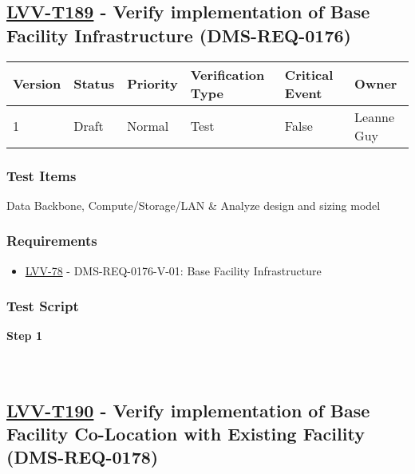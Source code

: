 \hypertarget{lvv-t189---verify-implementation-of-base-facility-infrastructure-dms-req-0176}{%
\subsection{\texorpdfstring{\href{https://jira.lsstcorp.org/secure/Tests.jspa\#/testCase/LVV-T189}{LVV-T189}
- Verify implementation of Base Facility Infrastructure
(DMS-REQ-0176)}{LVV-T189 - Verify implementation of Base Facility Infrastructure (DMS-REQ-0176)}}\label{lvv-t189---verify-implementation-of-base-facility-infrastructure-dms-req-0176}}

\begin{longtable}[]{@{}llllll@{}}
\toprule
Version & Status & Priority & Verification Type & Critical Event &
Owner\tabularnewline
\midrule
\endhead
1 & Draft & Normal & Test & False & Leanne Guy\tabularnewline
\bottomrule
\end{longtable}

\hypertarget{test-items-89}{%
\subsubsection{Test Items}\label{test-items-89}}

Data Backbone, Compute/Storage/LAN \& Analyze design and sizing model

\hypertarget{requirements-89}{%
\subsubsection{Requirements}\label{requirements-89}}

\begin{itemize}
\tightlist
\item
  \href{https://jira.lsstcorp.org/browse/LVV-78}{LVV-78} -
  DMS-REQ-0176-V-01: Base Facility Infrastructure
\end{itemize}

\hypertarget{test-script-89}{%
\subsubsection{Test Script}\label{test-script-89}}

\textbf{Step 1}\\
~\\
~\\

\hypertarget{lvv-t190---verify-implementation-of-base-facility-co-location-with-existing-facility-dms-req-0178}{%
\subsection{\texorpdfstring{\href{https://jira.lsstcorp.org/secure/Tests.jspa\#/testCase/LVV-T190}{LVV-T190}
- Verify implementation of Base Facility Co-Location with Existing
Facility
(DMS-REQ-0178)}{LVV-T190 - Verify implementation of Base Facility Co-Location with Existing Facility (DMS-REQ-0178)}}\label{lvv-t190---verify-implementation-of-base-facility-co-location-with-existing-facility-dms-req-0178}}

